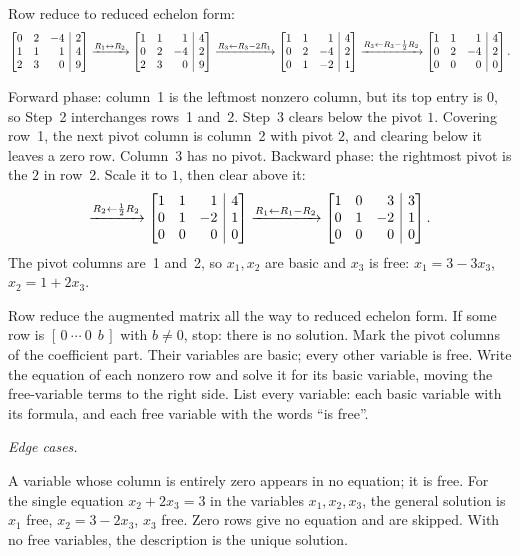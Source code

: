 \documentclass[10pt]{scrartcl}
\makeatletter
\newcommand{\aug}[2]{\left[\begin{array}{@{}#1@{}}#2\end{array}\right]}
\makeatother
\begin{document}
\begin{example*}
Row reduce to reduced echelon form:
\[
  \aug{rrr|r}{0&2&-4&2\\1&1&1&4\\2&3&0&9}
  \xrightarrow{R_1\leftrightarrow R_2}
  \aug{rrr|r}{1&1&1&4\\0&2&-4&2\\2&3&0&9}
  \xrightarrow{R_3\leftarrow R_3-2R_1}
  \aug{rrr|r}{1&1&1&4\\0&2&-4&2\\0&1&-2&1}
  \xrightarrow{R_3\leftarrow R_3-\frac12R_2}
  \aug{rrr|r}{1&1&1&4\\0&2&-4&2\\0&0&0&0}.
\]
\begin{steps}
  \ii Forward phase: column~1 is the leftmost nonzero column, but its top entry is $0$, so Step~2 interchanges rows~1 and~2. Step~3 clears below the pivot $1$. Covering row~1, the next pivot column is column~2 with pivot $2$, and clearing below it leaves a zero row. Column~3 has no pivot.
  \ii Backward phase: the rightmost pivot is the $2$ in row~2. Scale it to $1$, then clear above it:
  \[
    \xrightarrow{R_2\leftarrow \frac12R_2}
    \aug{rrr|r}{1&1&1&4\\0&1&-2&1\\0&0&0&0}
    \xrightarrow{R_1\leftarrow R_1-R_2}
    \aug{rrr|r}{1&0&3&3\\0&1&-2&1\\0&0&0&0}.
  \]
  \ii The pivot columns are~1 and~2, so $x_1,x_2$ are basic and $x_3$ is free: $x_1=3-3x_3$, $x_2=1+2x_3$.
\end{steps}
\end{example*}

\begin{steps}
  \ii Row reduce the augmented matrix all the way to reduced echelon form.
  \ii If some row is $[\,0\ \cdots\ 0\ \ b\,]$ with $b\ne0$, stop: there is no solution.
  \ii Mark the pivot columns of the coefficient part. Their variables are basic; every other variable is free.
  \ii Write the equation of each nonzero row and solve it for its basic variable, moving the free-variable terms to the right side.
  \ii List every variable: each basic variable with its formula, and each free variable with the words ``is free''.
\end{steps}
\emph{Edge cases.}
\begin{itemize}
  \ii A variable whose column is entirely zero appears in no equation; it is free. For the single equation $x_2+2x_3=3$ in the variables $x_1,x_2,x_3$, the general solution is $x_1$ free, $x_2=3-2x_3$, $x_3$ free.
  \ii Zero rows give no equation and are skipped.
  \ii With no free variables, the description is the unique solution.
\end{itemize}
\end{document}
